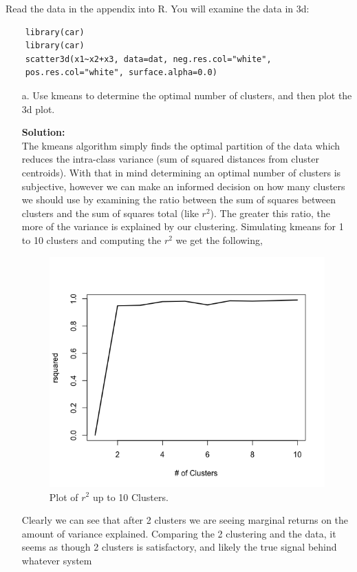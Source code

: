 \documentclass[12pt]{article}
\makeatletter
\theoremstyle{homework}
\newenvironment{exercise}[1]
{\def\@currentlabel{#1}\exercisecore}
{\endexercisecore}
\newcommand{\localhead}[1]{\par\smallskip\noindent\textbf{#1}\nobreak\\}%
\newcommand\solution{\localhead{Solution:}}
\makeatother
\begin{document}
\begin{exercise}{1} Read the data in the appendix into R. You will examine the data in 3d:
  \begin{footnotesize}
  \begin{verbatim}
    library(car)
    library(car)
    scatter3d(x1~x2+x3, data=dat, neg.res.col="white",
    pos.res.col="white", surface.alpha=0.0)
  \end{verbatim}
  \end{footnotesize}
  \begin{enumerate}
    \item[a.] Use kmeans to determine the optimal number of clusters, and then plot the 3d plot.\\
    \solution The kmeans algorithm simply finds the optimal partition of the data which reduces the intra-class variance (sum of squared distances from cluster 
    centroids). With that in mind determining an optimal number of clusters is subjective, however we can make an informed decision on how many clusters we should use 
    by examining the ratio between the sum of squares between clusters and the sum of squares total (like $r^2$). The greater this ratio, the more of the variance is explained by our clustering.
    Simulating kmeans for 1 to 10 clusters and computing the $r^2$ we get the following, 
      \begin{figure}[H]
        \begin{center}
          \caption{Plot of $r^2$ up to 10 Clusters.}
        \includegraphics[width = .65\textwidth]{Rplot01.png}
        \end{center}
      \end{figure}
      Clearly we can see that after 2 clusters we are seeing marginal returns on the amount of variance explained. 
      Comparing the 2 clustering and the data, it seems as though 2 clusters is satisfactory, and likely the true signal behind whatever system 

\end{enumerate}
\end{exercise}
\end{document}
